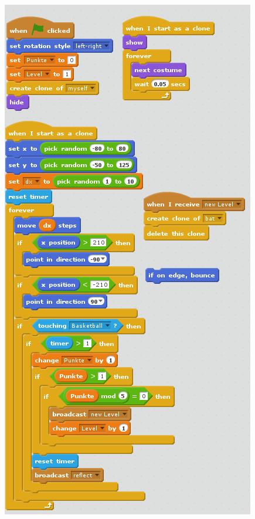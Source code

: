 \begin{minipage}{0.6\linewidth}
\begin{center}
\includegraphics[width=\linewidth]{scratch/fbatcode.png}
\end{center}    
\end{minipage}
